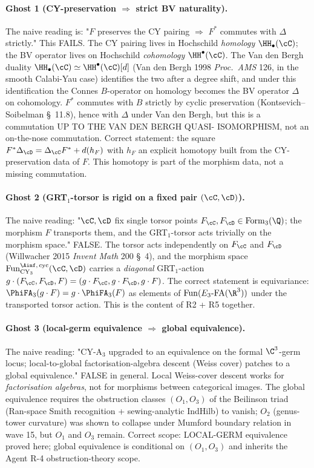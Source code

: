 \paragraph{Ghost 1 (CY-preservation $\Rightarrow$ strict BV naturality).}
The naive reading is: "$F$ preserves the CY pairing $\Rightarrow$ $F^*$
commutes with $\Delta$ strictly."  This FAILS.  The CY pairing lives in
Hochschild \emph{homology} $\HH_\bullet(\cC)$; the BV operator lives on
Hochschild \emph{cohomology} $\HH^\bullet(\cC)$.  The Van den Bergh
duality $\HH_\bullet(\cC) \simeq \HH^\bullet(\cC)[d]$ (Van den Bergh
1998 \emph{Proc.~AMS} 126, in the smooth Calabi-Yau case) identifies
the two after a degree shift, and under this identification the Connes
$B$-operator on homology becomes the BV operator $\Delta$ on
cohomology.  $F^*$ commutes with $B$ strictly by cyclic preservation
(Kontsevich--Soibelman \S~11.8), hence with $\Delta$ under Van den
Bergh, but this is a commutation UP TO THE VAN DEN BERGH QUASI-
ISOMORPHISM, not an on-the-nose commutation.  Correct statement: the
square $F^* \Delta_\cD = \Delta_\cC F^* + d(h_F)$ with $h_F$ an explicit
homotopy built from the CY-preservation data of $F$.  This homotopy is
part of the morphism data, not a missing commutation.

\paragraph{Ghost 2 (GRT$_1$-torsor is rigid on a fixed pair
$(\cC,\cD)$).}  The naive reading: "$\cC, \cD$ fix single torsor
points $F_\cC, F_\cD \in \mathrm{Form}_3(\Q)$; the morphism $F$
transports them, and the GRT$_1$-torsor acts trivially on the morphism
space."  FALSE.  The torsor acts independently on $F_\cC$ and $F_\cD$
(Willwacher 2015 \emph{Invent Math} 200 \S~4), and the morphism space
$\mathrm{Fun}^{\Ainf,\,\mathrm{cyc}}_{\mathrm{CY}_3}(\cC, \cD)$ carries
a \emph{diagonal} GRT$_1$-action $g \cdot (F_\cC, F_\cD, F) =
(g\cdot F_\cC, g\cdot F_\cD, g\cdot F)$.  The correct statement is
equivariance: $\PhiFA_3(g \cdot F) = g \cdot \PhiFA_3(F)$ as elements
of $\mathrm{Fun}(E_3\text{-FA}(\R^3))$ under the transported torsor
action.  This is the content of R2 + R5 together.

\paragraph{Ghost 3 (local-germ equivalence $\Rightarrow$ global
equivalence).}  The naive reading: "CY-A$_3$ upgraded to an
equivalence on the formal $\C^3$-germ locus; local-to-global
factorisation-algebra descent (Weiss cover) patches to a global
equivalence."  FALSE in general.  Local Weiss-cover descent works for
\emph{factorisation algebras}, not for morphisms between categorical
images.  The global equivalence requires the obstruction classes
$(O_1, O_3)$ of the Beilinson triad (Ran-space Smith recognition +
sewing-analytic IndHilb) to vanish; $O_2$ (genus-tower curvature) was
shown to collapse under Mumford boundary relation in wave 15, but
$O_1$ and $O_3$ remain.  Correct scope: LOCAL-GERM equivalence proved
here; global equivalence is conditional on $(O_1, O_3)$ and inherits
the Agent R-4 obstruction-theory scope.

